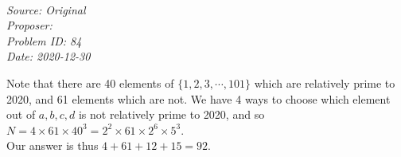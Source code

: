 \SSbreak\\
\emph{Source: Original}\\
\emph{Proposer: \Pnjoy}\\
\emph{Problem ID: 84}\\
\emph{Date: 2020-12-30}\\
\SSbreak

\bigskip

\begin{solution}\hfil\medskip
    
Note that there are 40 elements of \(\{1, 2, 3, \cdots, 101 \}\) which are relatively prime to 2020, and 61 elements which are not. We have 4 ways to choose which element out of \(a, b, c, d\) is not relatively prime to 2020, and so \(N = 4 \times 61 \times 40^3 = 2^2 \times 61 \times 2^6 \times 5^3\). \\
Our answer is thus \(4 + 61 + 12 + 15 = \boxed{92}\). 
\end{solution}\bigskip
